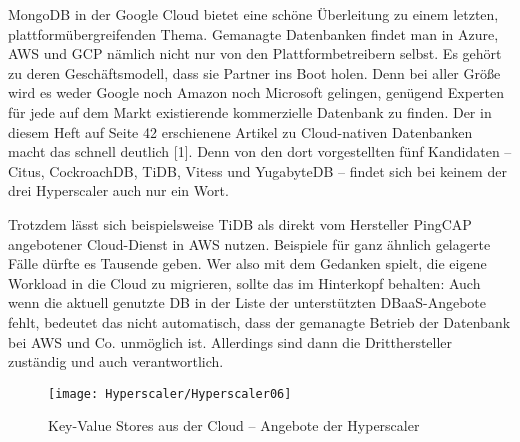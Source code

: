 MongoDB in der Google Cloud bietet eine schöne Überleitung zu einem letzten, plattformübergreifenden Thema. Gemanagte Datenbanken findet man in Azure, AWS und GCP nämlich nicht nur von den Plattformbetreibern selbst. Es gehört zu deren Geschäftsmodell, dass sie Partner ins Boot holen. Denn bei aller Größe wird es weder Google noch Amazon noch Microsoft gelingen, genügend Experten für jede auf dem Markt existierende kommerzielle Datenbank zu finden. Der in diesem Heft auf Seite 42 erschienene Artikel zu Cloud-nativen Datenbanken macht das schnell deutlich [1]. Denn von den dort vorgestellten fünf Kandidaten – Citus, CockroachDB, TiDB, Vitess und YugabyteDB – findet sich bei keinem der drei Hyperscaler auch nur ein Wort.

Trotzdem lässt sich beispielsweise TiDB als direkt vom Hersteller PingCAP angebotener Cloud-Dienst in AWS nutzen. Beispiele für ganz ähnlich gelagerte Fälle dürfte es Tausende geben. Wer also mit dem Gedanken spielt, die eigene Workload in die Cloud zu migrieren, sollte das im Hinterkopf behalten: Auch wenn die aktuell genutzte DB in der Liste der unterstützten DBaaS-Angebote fehlt, bedeutet das nicht automatisch, dass der gemanagte Betrieb der Datenbank bei AWS und Co. unmöglich ist. Allerdings sind dann die Dritthersteller zuständig und auch verantwortlich.

\begin{figure}
	
	\begin{center}
		
		\texttt{[image: Hyperscaler/Hyperscaler06]}
		
		
		\caption{Key-Value Stores aus der Cloud -- Angebote der Hyperscaler}
	\end{center} 
\end{figure}


